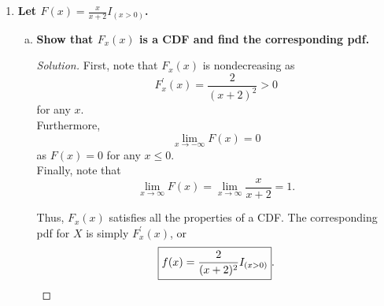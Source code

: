 \documentclass[11pt]{article}
\newenvironment{solution}
  {\renewcommand\qedsymbol{$\blacksquare$}\begin{proof}[Solution]}
  {\end{proof}}
\begin{document}
\begin{enumerate}
\begin{enumerate}[a)]
\begin{solution}
        Thus, the pdf for $Y$ is 
        \[
            \boxed{f_Y(y) = \frac{\left( \frac{\alpha}{\mu} \right)^{\alpha} }{\Gamma(\alpha)} y^{-\alpha - 1} e^{- \frac{\alpha}{\mu y} }}.
        \]

        To identify the mode of $y$, we can once again work to maximize the log of the pdf for $Y$, denoted $\ell(y)$ for convenience. Note that
        \[
            \ell(y) = \ln \left( \frac{\left( \frac{\alpha}{\mu} \right)^{\alpha} }{\Gamma(\alpha)} \right) + (-\alpha - 1) \ln(y) - \frac{\alpha}{\mu y}.
        \]

        Taking the derivative of $\ell(y)$, we find
        \[
            \ell^{\prime}(y) = \frac{-\alpha - 1}{y} + \frac{\alpha}{\mu y^2}.
        \]

        The mode occurs when $\ell^{\prime}(y) = 0$, or when $\frac{\alpha + 1}{y} + \frac{\alpha}{\mu y^2}$. Solving for $y$, we find that the mode is at
        \[
            \boxed{y = \frac{\alpha}{\mu(\alpha + 1)}}
        \]
        for all $\alpha > 0$.
        \end{solution}
    \end{enumerate}

    \item \textbf{Let $F(x) = \frac{x}{x+2} I_{(x > 0)}$.}
    
    \begin{enumerate}[a)]
        \item \textbf{Show that $F_x(x)$ is a CDF and find the corresponding pdf.}
        
        \begin{solution}
        First, note that $F_x(x)$ is nondecreasing as 
        \[
            F^{\prime}_x(x) = \frac{2}{(x+2)^2} > 0
        \] 
        for any $x$. \\

        Furthermore,
        \[
            \lim_{x \to -\infty} F(x) = 0
        \]
        as $F(x) = 0$ for any $x \leq 0$. \\
        
        Finally, note that  
        \[
            \lim_{x \to \infty} F(x) = \lim_{x \to \infty} \frac{x}{x+2} = 1.
        \]

        Thus, $F_x(x)$ satisfies all the properties of a CDF. The corresponding pdf for $X$ is simply $F^{\prime}_x(x)$, or
        \[
            \boxed{f(x) = \frac{2}{(x+2)^2} I_{(x > 0)}}. \qedhere
        \]
        \end{solution}


\end{enumerate}
\end{enumerate}
\end{document}
